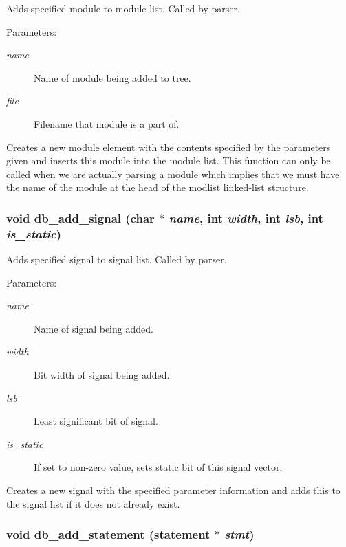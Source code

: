 Adds specified module to module list. Called by parser.

\begin{Desc}
\item[Parameters: ]\par
\begin{description}
\item[{\em 
name}]Name of module being added to tree. \item[{\em 
file}]Filename that module is a part of.\end{description}
\end{Desc}
Creates a new module element with the contents specified by the parameters given and inserts this module into the module list. This function can only be called when we are actually parsing a module which implies that we must have the name of the module at the head of the modlist linked-list structure. 
\subsubsection{\setlength{\rightskip}{0pt plus 5cm}void db\_\-add\_\-signal (char $\ast$ {\em name}, int {\em width}, int {\em lsb}, int {\em is\_\-static})}\label{db_8c_a19}


Adds specified signal to signal list. Called by parser.

\begin{Desc}
\item[Parameters: ]\par
\begin{description}
\item[{\em 
name}]Name of signal being added. \item[{\em 
width}]Bit width of signal being added. \item[{\em 
lsb}]Least significant bit of signal. \item[{\em 
is\_\-static}]If set to non-zero value, sets static bit of this signal vector.\end{description}
\end{Desc}
Creates a new signal with the specified parameter information and adds this to the signal list if it does not already exist. 
\subsubsection{\setlength{\rightskip}{0pt plus 5cm}void db\_\-add\_\-statement ({\bf statement} $\ast$ {\em stmt})}\label{db_8c_a24}


